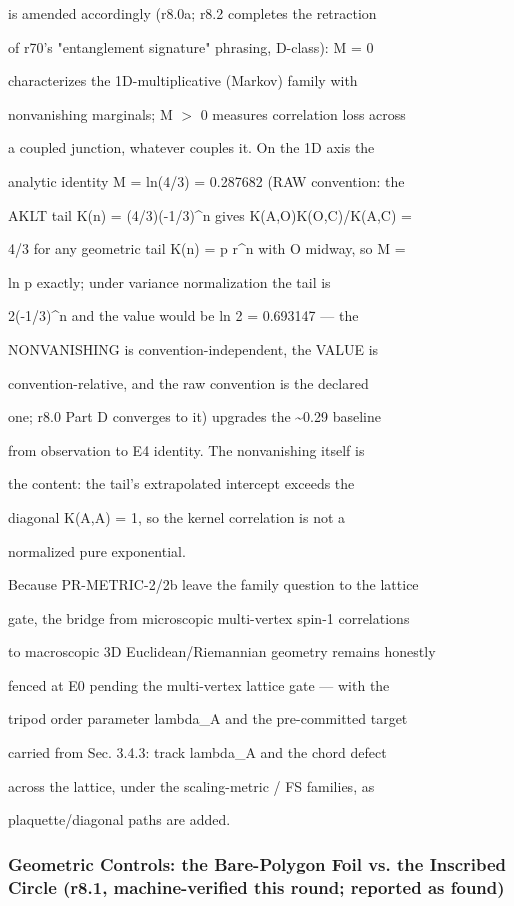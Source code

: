 \documentclass[11pt,a4paper]{article}
\theoremstyle{definition}
\begin{document}
    is amended accordingly (r8.0a; r8.2 completes the retraction

    of r70's "entanglement signature" phrasing, D-class): M = 0

    characterizes the 1D-multiplicative (Markov) family with

    nonvanishing marginals; M $>$ 0 measures correlation loss across

    a coupled junction, whatever couples it. On the 1D axis the

    analytic identity M = ln(4/3) = 0.287682 (RAW convention: the

    AKLT tail K(n) = (4/3)(-1/3)\^{}n gives K(A,O)K(O,C)/K(A,C) =

    4/3 for any geometric tail K(n) = p r\^{}n with O midway, so M =

    ln p exactly; under variance normalization the tail is

    2(-1/3)\^{}n and the value would be ln 2 = 0.693147 — the

    NONVANISHING is convention-independent, the VALUE is

    convention-relative, and the raw convention is the declared

    one; r8.0 Part D converges to it) upgrades the \textasciitilde{}0.29 baseline

    from observation to E4 identity. The nonvanishing itself is

    the content: the tail's extrapolated intercept exceeds the

    diagonal K(A,A) = 1, so the kernel correlation is not a

    normalized pure exponential.


Because PR-METRIC-2/2b leave the family question to the lattice

gate, the bridge from microscopic multi-vertex spin-1 correlations

to macroscopic 3D Euclidean/Riemannian geometry remains honestly

fenced at E0 pending the multi-vertex lattice gate — with the

tripod order parameter lambda\_A and the pre-committed target

carried from Sec. 3.4.3: track lambda\_A and the chord defect

across the lattice, under the scaling-metric / FS families, as

plaquette/diagonal paths are added.


\subsubsection{Geometric Controls: the Bare-Polygon Foil vs. the Inscribed Circle (r8.1, machine-verified this round; reported as found)}
\end{document}
